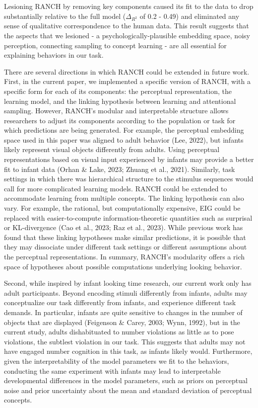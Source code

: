 \documentclass[10pt, letterpaper]{article}
\begin{document}
Lesioning RANCH by removing key components caused its fit to the data to
drop substantially relative to the full model (\(\Delta_{R^2}\) of 0.2 -
0.49) and eliminated any sense of qualitative correspondence to the
human data. This result suggests that the aspects that we lesioned - a
psychologically-plausible embedding space, noisy perception, connecting
sampling to concept learning - are all essential for explaining
behaviors in our task.

There are several directions in which RANCH could be extended in future
work. First, in the current paper, we implemented a specific version of
RANCH, with a specific form for each of its components: the perceptual
representation, the learning model, and the linking hypothesis between
learning and attentional sampling. However, RANCH's modular and
interpretable structure allows researchers to adjust its components
according to the population or task for which predictions are being
generated. For example, the perceptual embedding space used in this
paper was aligned to adult behavior (Lee, 2022), but infants likely
represent visual objects differently from adults. Using perceptual
representations based on visual input experienced by infants may provide
a better fit to infant data (Orhan \& Lake, 2023; Zhuang et al., 2021).
Similarly, task settings in which there was hierarchical structure to
the stimulus sequences would call for more complicated learning models.
RANCH could be extended to accommodate learning from multiple concepts.
The linking hypothesis can also vary. For example, the rational, but
computationally expensive, EIG could be replaced with easier-to-compute
information-theoretic quantities such as surprisal or KL-divergence (Cao
et al., 2023; Raz et al., 2023). While previous work has found that
these linking hypotheses make similar predictions, it is possible that
they may dissociate under different task settings or different
assumptions about the perceptual representations. In summary, RANCH's
modularity offers a rich space of hypotheses about possible computations
underlying looking behavior.

Second, while inspired by infant looking time research, our current work
only has adult participants. Beyond encoding stimuli differently from
infants, adults may conceptualize our task differently from infants, and
experience different task demands. In particular, infants are quite
sensitive to changes in the number of objects that are displayed
(Feigenson \& Carey, 2003; Wynn, 1992), but in the current study, adults
dishabituated to number violations as little as to pose violations, the
subtlest violation in our task. This suggests that adults may not have
engaged number cognition in this task, as infants likely would.
Furthermore, given the interpretability of the model parameters we fit
to the behaviors, conducting the same experiment with infants may lead
to interpretable developmental differences in the model parameters, such
as priors on perceptual noise and prior uncertainty about the mean and
standard deviation of perceptual concepts.
\end{document}
